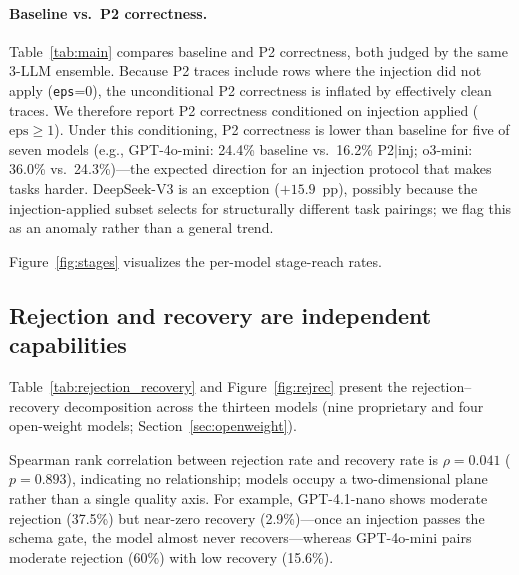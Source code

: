 \documentclass{article}
\begin{document}
\paragraph{Baseline vs.\ P2 correctness.}
Table~\ref{tab:main} compares baseline and P2 correctness, both judged
by the same 3-LLM ensemble.
Because P2 traces include rows where the injection did not apply
(\texttt{eps}{=}0), the unconditional P2 correctness is inflated by
effectively clean traces.
We therefore report P2 correctness conditioned on injection applied
($\text{eps}{\geq}1$).
Under this conditioning, P2 correctness is lower than baseline for
five of seven models (e.g., GPT-4o-mini: 24.4\% baseline vs.\
16.2\% P2$|$inj; o3-mini: 36.0\% vs.\ 24.3\%)---the expected
direction for an injection protocol that makes tasks harder.
DeepSeek-V3 is an exception ($+15.9$~pp), possibly because the
injection-applied subset selects for structurally different task
pairings; we flag this as an anomaly rather than a general trend.



Figure~\ref{fig:stages} visualizes the per-model stage-reach rates.


\subsection{Rejection and recovery are independent capabilities}
\label{sec:rejrec}

Table~\ref{tab:rejection_recovery} and Figure~\ref{fig:rejrec} present the
rejection--recovery decomposition across the thirteen models (nine proprietary
and four open-weight models; Section~\ref{sec:openweight}).




Spearman rank correlation between rejection rate and recovery rate is
$\rho{=}0.041$ ($p{=}0.893$), indicating no relationship; models occupy a
two-dimensional plane rather than a single quality axis.
For example, GPT-4.1-nano shows moderate rejection (37.5\%) but near-zero
recovery (2.9\%)---once an injection passes the schema gate, the model almost
never recovers---whereas GPT-4o-mini pairs moderate rejection (60\%) with low
recovery (15.6\%).
\end{document}
